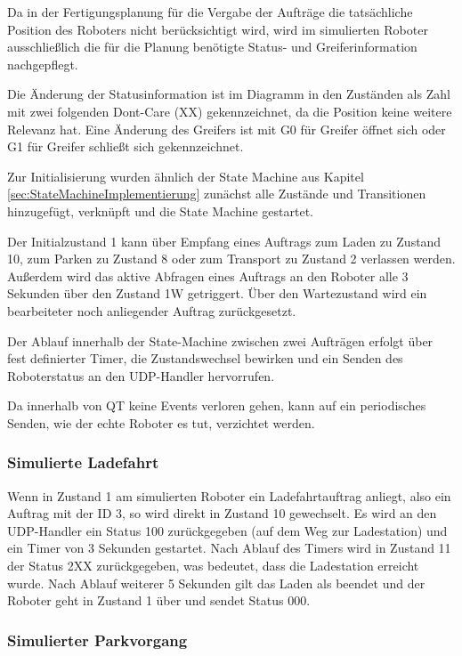 Da in der Fertigungsplanung für die Vergabe der Aufträge die tatsächliche Position des Roboters nicht berücksichtigt wird, wird im simulierten Roboter ausschließlich die für die Planung benötigte Status- und Greiferinformation nachgepflegt. 

Die Änderung der Statusinformation ist im Diagramm in den Zuständen als Zahl mit zwei folgenden Dont-Care (XX) gekennzeichnet, da die Position keine weitere Relevanz hat. Eine Änderung des Greifers ist mit G0 für Greifer öffnet sich oder G1 für Greifer schließt sich gekennzeichnet.

Zur Initialisierung wurden ähnlich der State Machine aus Kapitel \ref{sec:StateMachineImplementierung} zunächst alle Zustände und Transitionen hinzugefügt, verknüpft und die State Machine gestartet. 

Der Initialzustand 1 kann über Empfang eines Auftrags zum Laden zu Zustand 10, zum Parken zu Zustand 8 oder zum Transport zu Zustand 2 verlassen werden. Außerdem wird das aktive Abfragen eines Auftrags an den Roboter alle 3 Sekunden über den Zustand 1W getriggert. Über den Wartezustand wird ein bearbeiteter noch anliegender Auftrag zurückgesetzt. 

Der Ablauf innerhalb der State-Machine zwischen zwei Aufträgen erfolgt über fest definierter Timer, die Zustandswechsel bewirken und ein Senden des Roboterstatus an den UDP-Handler hervorrufen.

Da innerhalb von QT keine Events verloren gehen, kann auf ein periodisches Senden, wie der echte Roboter es tut, verzichtet werden.

\subsubsection{Simulierte Ladefahrt}

Wenn in Zustand 1 am simulierten Roboter ein Ladefahrtauftrag anliegt, also ein Auftrag mit der ID 3, so wird direkt in Zustand 10 gewechselt. Es wird an den UDP-Handler ein Status 100 zurückgegeben  (auf dem Weg zur Ladestation) und ein Timer von 3 Sekunden gestartet. Nach Ablauf des Timers wird in Zustand 11 der Status 2XX zurückgegeben, was bedeutet, dass die Ladestation erreicht wurde. Nach Ablauf weiterer 5 Sekunden gilt das Laden als beendet und der Roboter geht in Zustand 1 über und sendet Status 000.

\subsubsection{Simulierter Parkvorgang}

